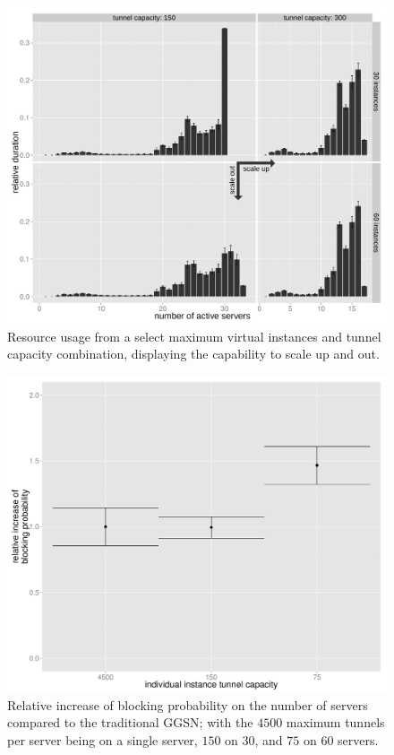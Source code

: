 \begin{figure}[htb]
  \centering
  \includegraphics[width=1.0\textwidth]{images/R-virtualized-instanceuse-barplot.pdf}
  \caption{Resource usage from a select maximum virtual instances and tunnel capacity combination, displaying the capability to scale up and out.}
 \label{c4:fig:res-usage-barplot}
\end{figure}



\begin{figure}[htb]
  \centering
  \includegraphics[width=1.0\textwidth]{images/blocking-comparison.pdf}
  \caption{Relative increase of blocking probability on the number of servers compared to the traditional \gls{GGSN}; with the $4500$ maximum tunnels per server being on a single server, $150$ on $30$, and $75$ on $60$ servers.}
 \label{c4:fig:blocking-comparison}
\end{figure}

